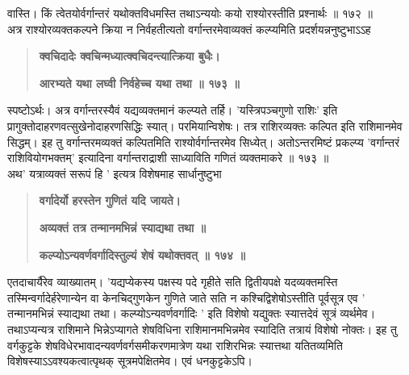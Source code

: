 \documentclass[11pt, openany]{book}
\begin{document}
\begin{sloppypar}
\hangindent=0.2in वास्ति। किं त्वेतयोर्वर्गान्तरं यथोक्तविधमस्ति तथाऽन्ययोः कयो राश्योरस्तीति प्रश्नार्थः ॥ १७२ ॥\\

\hangindent=0.2in \hspace{0.2in}अत्र राश्योरव्यक्तकल्पने क्रिया न निर्वहतीत्यतो वर्गान्तरमेवाव्यक्तं कल्प्यमिति प्रदर्शयन्ननुष्टुभाऽऽह\textendash

\begin{quote}
\hspace{1in}\textbf{क्वचिदादेः क्वचिन्मध्यात्क्वचिदन्त्यात्क्रिया बुधैः।}

\hspace{1in}\textbf{आरभ्यते यथा लघ्वी निर्वहेच्च यथा तथा ॥ १७३ ॥}
\end{quote}

\hangindent=0.2in \hspace{0.2in}स्पष्टोऽर्थः। अत्र वर्गान्तरस्यैवं यद्यव्यक्तमानं कल्प्यते तर्हि। 'यस्त्रिपञ्चगुणो राशिः' इति प्रागुक्तोदाहरणवत्सुखेनोदाहरणसिद्धिः स्यात्। परमियान्विशेषः। तत्र राशिरव्यक्तः कल्पित इति राशिमानमेव सिद्धम्। इह तु वर्गान्तरमव्यक्तं कल्पितमिति राश्योर्वर्गान्तरमेव सिध्येत्। अतोऽन्तरमिष्टं प्रकल्प्य 'वर्गान्तरं राशिवियोगभक्तम्' इत्यादिना वर्गान्तराद्राशी साध्याविति गणितं व्यक्तमाकरे ॥ १७३ ॥\\

अथ' यत्राव्यक्तं सरूपं हि ' इत्यत्र विशेषमाह सार्धानुष्टुभा\textendash

\begin{quote}
\hspace{1in}\textbf{वर्गादेर्यो हरस्तेन गुणितं यदि जायते।}

\hspace{1in}\textbf{अव्यक्तं तत्र तन्मानमभिन्नं स्याद्यथा तथा ॥}

\hspace{1in}\textbf{कल्प्योऽन्यवर्णवर्गादिस्तुल्यं शेषं यथोक्तवत् ॥ १७४ ॥}
\end{quote}

\hangindent=0.2in \hspace{0.2in}एतदाचार्यैरेव व्याख्यातम्। 'यद्यप्येकस्य पक्षस्य पदे गृहीते सति द्वितीयपक्षे यदव्यक्तमस्ति तस्मिन्वर्गादेर्हरेणान्येन वा केनचिद्गुणकेन गुणिते जाते सति न कश्चिद्विशेषोऽस्तीति पूर्वसूत्र एव ' तन्मानमभिन्नं स्याद्यथा तथा। कल्प्योऽन्यवर्णवर्गादिः ' इति विशेषो यद्युक्तः स्यात्तदेवं सूत्रं व्यर्थमेव। तथाऽप्यन्यत्र राशिमाने भिन्नेऽप्यागते शेषविधिना राशिमानमभिन्नमेव स्यादिति तत्रायं विशेषो नोक्तः। इह तु वर्गकुट्टके शेषविधेरभावादन्यवर्णवर्गसमीकरणमात्रेण यथा राशिरभिन्नः स्यात्तथा यतितव्यमिति विशेषस्याऽऽवश्यकत्वात्पृथक् सूत्रमपेक्षितमेव। एवं धनकुट्टकेऽपि।\\


\end{sloppypar}
\end{document}
